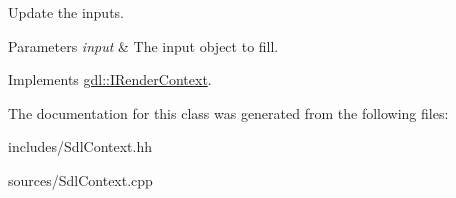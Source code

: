Update the inputs. 


\begin{DoxyParams}{Parameters}
{\em input} & The input object to fill. \\
\hline
\end{DoxyParams}


Implements \hyperlink{classgdl_1_1_i_render_context}{gdl\-::\-I\-Render\-Context}.



The documentation for this class was generated from the following files\-:\begin{DoxyCompactItemize}
\item 
includes/Sdl\-Context.\-hh\item 
sources/Sdl\-Context.\-cpp\end{DoxyCompactItemize}
